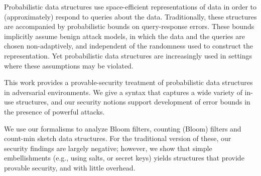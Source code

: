 Probabilistic data structures use space-efficient representations of data in
order to (approximately) respond to queries about the data. 
Traditionally, these structures are accompanied by probabilistic bounds on
query-response errors. These bounds implicitly assume benign attack
models, in which the data and the queries are chosen
non-adaptively, and independent of the randomness used to
construct the representation. Yet probabilistic data structures are
increasingly used in settings where these assumptions may be violated.

This work provides a provable-security treatment of probabilistic data
structures in adversarial environments. We give a syntax that captures a wide
variety of in-use structures, and our security notions support
development of error bounds in the presence of powerful attacks.

We use our formalisms to analyze Bloom filters, counting (Bloom) filters and count-min sketch data structures.
For the traditional version of these, our security findings are largely
negative; however, we show that simple embellishments (e.g., using salts, or
secret keys) yields structures that provide provable security, and with little
overhead.